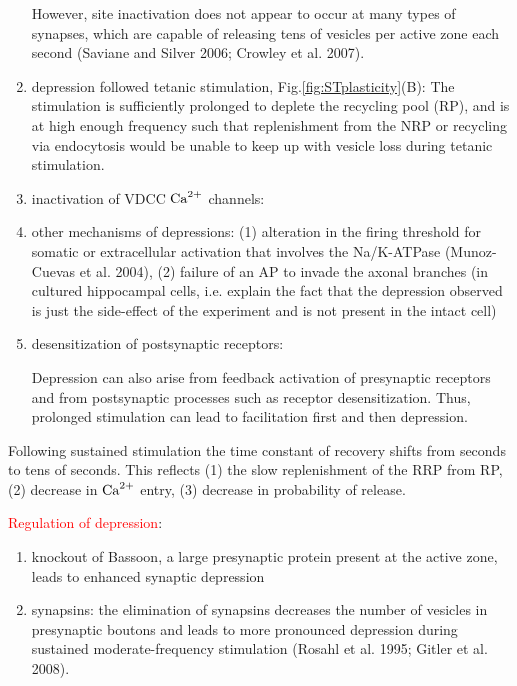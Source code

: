\begin{enumerate}
    However, site inactivation does not appear to occur at many types of
    synapses, which are capable of releasing tens of vesicles per active zone each second
    (Saviane and Silver 2006; Crowley et al. 2007).

    \item depression followed tetanic stimulation,
    Fig.\ref{fig:STplasticity}(B):
    The stimulation is sufficiently prolonged to deplete the recycling pool
    (RP), and is at high enough frequency such that replenishment
from the NRP or recycling via endocytosis would be unable to keep up with
vesicle loss during tetanic stimulation.

    \item inactivation of VDCC ${\text{Ca}^{2+}}$ channels:
    
    \item other mechanisms of depressions:
    (1) alteration in the firing threshold for somatic or extracellular
    activation that involves the Na/K-ATPase (Munoz-Cuevas et al. 2004), (2)
    failure of an AP to invade the axonal branches (in cultured hippocampal
    cells, i.e. explain the fact that the depression observed is just the
    side-effect of the experiment and is not present in the intact cell)
        
    \item desensitization of postsynaptic receptors: 
    
Depression can also arise from feedback activation of presynaptic receptors and
from postsynaptic processes such as receptor desensitization.
Thus, prolonged stimulation can lead to facilitation first and then depression.

\end{enumerate}
Following sustained stimulation the time constant of recovery
shifts from seconds to tens of seconds. This reflects (1) the slow replenishment
of the RRP from RP, (2) decrease in ${\text{Ca}^{2+}}$ entry, (3) decrease in probability of
release.

\textcolor{red}{Regulation of depression}:
\begin{enumerate}
  \item knockout of Bassoon, a large presynaptic
protein present at the active zone, leads to
enhanced synaptic depression

  \item synapsins: 
  the elimination of synapsins decreases
the number of vesicles in presynaptic
boutons and leads to more pronounced depression
during sustained moderate-frequency
stimulation (Rosahl et al. 1995; Gitler et al.
2008).
   
\end{enumerate}

